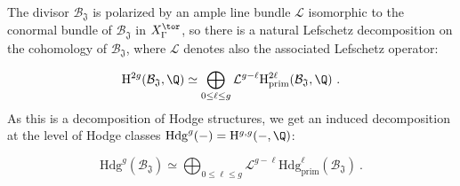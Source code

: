 \documentclass[11pt,letterpaper,english]{amsart}
\numberwithin{equation}{subsection}
\numberwithin{equation}{section}
\newcommand\cB{{\mathcal B}}
\newcommand\cL{{\mathcal L}}
\newcommand\fJ{{\mathfrak J}}
\theoremstyle{plain}
\theoremstyle{remark}
\begin{document}
The divisor $\cB_{\mathfrak J}$ is polarized by an ample line bundle $\mathcal L$ isomorphic to the conormal bundle of $\cB_\fJ$ in $X_\Gamma^\tor$, so there is a natural Lefschetz decomposition on the cohomology of $\cB_\fJ$, where $\mathcal L$ denotes also the associated Lefschetz operator:

\[\mathrm{H}^{2g}(\cB_{\mathfrak J},\Q)\simeq \bigoplus _{0\leq \ell\leq g}\cL^{g-\ell}\mathrm{H}^{2\ell}_{\mathrm{prim}}(\mathcal{B}_\mathfrak{J},\Q)~.\]
As this is a decomposition of Hodge structures, we get an induced decomposition at the level of Hodge classes $\mathrm{Hdg}^{g}(-) = \mathrm{H}^{g,g}(-,\Q)$:

\[\mathrm{Hdg}^{g}(\cB_{\mathfrak J})\simeq \bigoplus _{0\leq \ell\leq g}\cL^{g-\ell}\mathrm{Hdg}^{\ell}_{\mathrm{prim}}(\mathcal{B}_\mathfrak{J})~.\]
\end{document}
